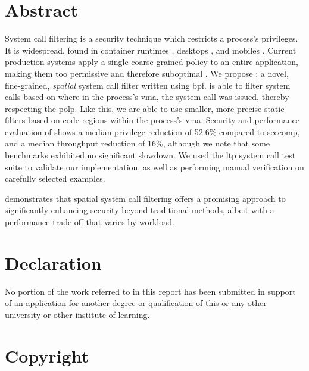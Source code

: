 \section*{Abstract}


System call filtering is a security technique which restricts a process's
privileges. It is widespread, found in container runtimes 
\cite{docker_seccomp}, desktops \cite{chromium_sandboxing,
firefox_seccomp}, and mobiles \cite{android_seccomp_oreo}. Current
production systems apply a single coarse-grained policy to
an entire application, making them too permissive and therefore suboptimal
\cite{OPTIMUS}. 
We propose \af: a novel, fine-grained, \textit{spatial} system call filter
written using \ac{bpf}. \af is able to filter system calls based on where in
the process's \ac{vma}, the system call was issued, thereby respecting the 
\ac{polp}\cite{SALTZER_SCHROEDER}. Like this, we are able to use smaller, 
more precise static filters based on code regions within the process's \ac{vma}.
Security and performance evaluation of \af shows a median
privilege
reduction of 52.6\% compared to seccomp, and a median throughput reduction
of 16\%, although we note that some benchmarks exhibited no significant
slowdown. We used the \ac{ltp} system call test suite to validate our
implementation, as well as performing manual verification on carefully
selected examples.

\af demonstrates that spatial system call filtering offers a promising
approach to significantly enhancing security beyond traditional methods, albeit
with a performance trade-off that varies by workload.

\clearpage

\section*{Declaration}

No portion of the work referred to in this report has been
submitted in support of an application for another degree or
qualification of this or any other university or other institute
of learning.

\clearpage

\section*{Copyright}

